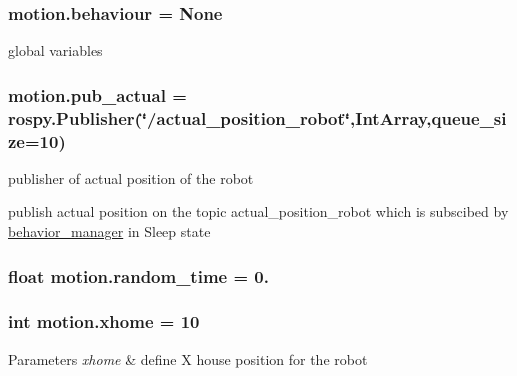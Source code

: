 \subsubsection[{\texorpdfstring{behaviour}{behaviour}}]{\setlength{\rightskip}{0pt plus 5cm}motion.\+behaviour = None}\hypertarget{namespacemotion_a15d63b2a70ac940f179085ce72871c86}{}\label{namespacemotion_a15d63b2a70ac940f179085ce72871c86}


global variables 

\subsubsection[{\texorpdfstring{pub\+\_\+actual}{pub_actual}}]{\setlength{\rightskip}{0pt plus 5cm}motion.\+pub\+\_\+actual = rospy.\+Publisher(\char`\"{}/actual\+\_\+position\+\_\+robot\char`\"{},Int\+Array,queue\+\_\+size=10)}\hypertarget{namespacemotion_a9213de80f34f408518c9265ee283b588}{}\label{namespacemotion_a9213de80f34f408518c9265ee283b588}


publisher of actual position of the robot 

publish actual position on the topic actual\+\_\+position\+\_\+robot which is subscibed by \hyperlink{namespacebehavior__manager}{behavior\+\_\+manager} in Sleep state 
\subsubsection[{\texorpdfstring{random\+\_\+time}{random_time}}]{\setlength{\rightskip}{0pt plus 5cm}float motion.\+random\+\_\+time = 0.}\hypertarget{namespacemotion_a577a5f71c1bdf849f48eed17c4134bee}{}\label{namespacemotion_a577a5f71c1bdf849f48eed17c4134bee}
\subsubsection[{\texorpdfstring{xhome}{xhome}}]{\setlength{\rightskip}{0pt plus 5cm}int motion.\+xhome = 10}\hypertarget{namespacemotion_a8e0cdf80e6970df1d82ccd96e3f68a1a}{}\label{namespacemotion_a8e0cdf80e6970df1d82ccd96e3f68a1a}

\begin{DoxyParams}{Parameters}
{\em xhome} & define X house position for the robot \\
\hline
\end{DoxyParams}
